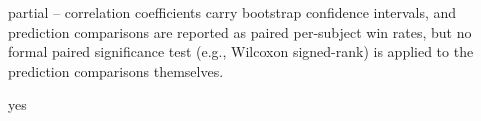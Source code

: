 \documentclass[letterpaper]{article}
\begin{document}
\begin{itemize}
\begin{itemize}
	partial -- correlation coefficients carry bootstrap confidence intervals, and prediction
	comparisons are reported as paired per-subject win rates, but no formal paired significance test
	(e.g., Wilcoxon signed-rank) is applied to the prediction comparisons themselves.

	yes


\end{itemize}
\end{itemize}
\ifreproStandalone
\end{document}
